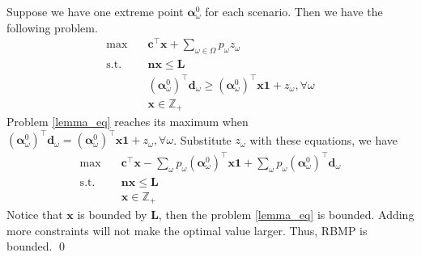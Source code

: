   \begin{pf}
    Suppose we have one extreme point $\bm{\alpha}_{\omega}^{0}$ for each scenario. Then we have the following problem.
    \begin{equation}\label{lemma_eq}
      \begin{aligned}
        \max \quad & \mathbf{c}^{\intercal} \mathbf{x} + \sum_{\omega \in \Omega} p_{\omega} z_{\omega} \\
        \text {s.t.} \quad & \mathbf{n} \mathbf{x} \leq \mathbf{L} \\
        & (\bm{\alpha}_{\omega}^{0})^{\intercal}\mathbf{d}_{\omega} \geq (\bm{\alpha}_{\omega}^{0})^{\intercal} \mathbf{x} \mathbf{1} + z_{\omega}, \forall \omega \\
         & \mathbf{x} \in \mathbb{Z}_{+}
      \end{aligned}
    \end{equation}
    Problem \eqref{lemma_eq} reaches its maximum when $(\bm{\alpha}_{\omega}^{0})^{\intercal}\mathbf{d}_{\omega} = (\bm{\alpha}_{\omega}^{0})^{\intercal} \mathbf{x} \mathbf{1} + z_{\omega}, \forall \omega$. Substitute $z_{\omega}$ with these equations, we have 
    \begin{equation}\label{lemma_eq2}
      \begin{aligned}
        \max \quad & \mathbf{c}^{\intercal} \mathbf{x} - \sum_{\omega}p_{\omega}(\bm{\alpha}_{\omega}^{0})^{\intercal} \mathbf{x} \mathbf{1} + \sum_{\omega} p_{\omega} (\bm{\alpha}_{\omega}^{0})^{\intercal} \mathbf{d}_{\omega} \\
        \text {s.t.} \quad & \mathbf{n} \mathbf{x} \leq \mathbf{L} \\
        & \mathbf{x} \in \mathbb{Z}_{+}
      \end{aligned}
    \end{equation}
    Notice that $\mathbf{x}$ is bounded by $\mathbf{L}$, then the problem \eqref{lemma_eq} is bounded. Adding more constraints will not make the optimal value larger. Thus, RBMP is bounded. 
    \qed
  \end{pf}

